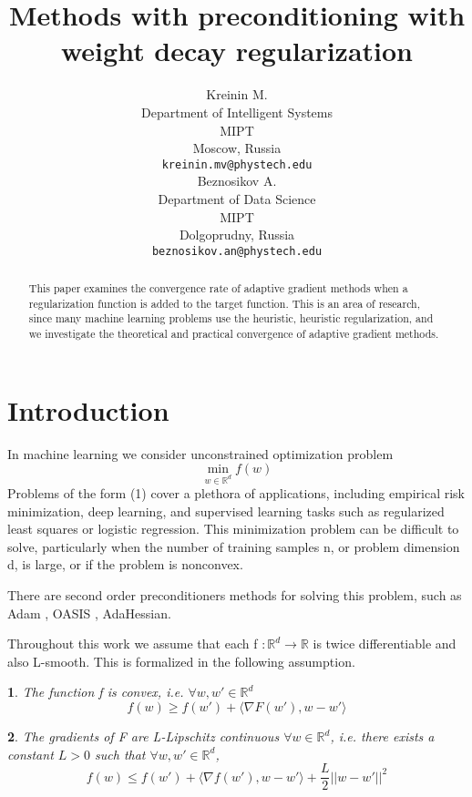\documentclass{article}
\title{Methods with preconditioning with weight decay regularization}
\author{ Kreinin M. \\
	Department of Intelligent Systems\\
	MIPT\\
	Moscow, Russia \\
	\texttt{kreinin.mv@phystech.edu} \\
	\And
	Beznosikov A. \\
	Department of Data Science\\
	MIPT\\
	Dolgoprudny, Russia \\
	\texttt{beznosikov.an@phystech.edu} \\
}
\date{}
\makeatletter
\newtheorem*{assumption*}{\assumptionnumber}
\providecommand{\assumptionnumber}{}
\newenvironment{assumption}[2]
 {%
  \renewcommand{\assumptionnumber}{\textbf{Assumption} #1 ({#2})}%
  \begin{assumption*}%
  \protected@edef\@currentlabel{#1-#2}%
 }
 {%
  \end{assumption*}
 }
\makeatother
\begin{document}
\maketitle

\begin{abstract}
	This paper examines the convergence rate of adaptive gradient methods when a regularization function is added to the target function. This is an area of research, since many machine learning problems use the heuristic, heuristic regularization, and we investigate the theoretical and practical convergence of adaptive gradient methods.
\end{abstract}


\section{Introduction}
In machine learning we consider unconstrained optimization problem
\begin{equation*}
	\min_{w \in \mathbb{R}^d} f(w)
\end{equation*}
Problems of the form (1) cover a plethora of applications, including empirical risk minimization,
deep learning, and supervised learning tasks such as regularized least squares or logistic regression. This minimization problem can be difficult to solve, particularly when the number of training
samples n, or problem dimension d, is large, or if the problem is nonconvex.

There are second order preconditioners methods for solving this problem, such as Adam \citep{kingma2014adam} , OASIS \citep{}, AdaHessian. 

Throughout this work we assume that each f $:\mathbb{R}^d \rightarrow \mathbb{R}$ is twice differentiable and also L-smooth. This is formalized in the following assumption.

\begin{assumption}{1}{Convex}
	The function f is convex, i.e. $\forall w, w' \in \mathbb{R}^d$
	\begin{equation}
		f(w) \geq f(w') + \langle \nabla F(w'), w-w' \rangle
	\end{equation}
\end{assumption}

\begin{assumption}{2}{L-smoothness}
	The gradients of F are L-Lipschitz continuous $\forall w \in \mathbb{R}^d$, i.e. there exists a constant $L > 0$ such that $\forall w, w' \in \mathbb{R}^d$,
	\begin{equation*}
		f(w) \leq f(w') + \langle \nabla f(w'), w-w' \rangle + \frac{L}{2} ||w - w'||^2
	\end{equation*}
\end{assumption}
\end{document}
